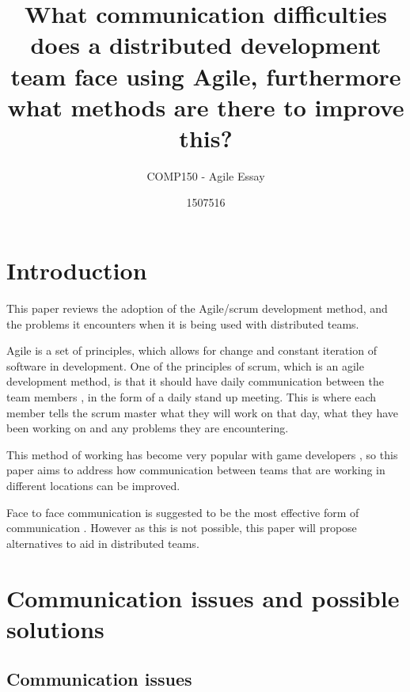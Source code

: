\documentclass{scrartcl}
\title{What communication difficulties does a distributed development team face using Agile, furthermore what methods are there to improve this?}
\subtitle{COMP150 - Agile Essay}
\author{1507516}
\begin{document}
\maketitle


\section{Introduction}

This paper reviews the adoption of the Agile/scrum development method, and the problems it encounters when it is being used with distributed teams.

Agile is a set of principles, which allows for change and constant iteration of software in development. One of the principles of scrum, which is an agile development method, is that it should have daily communication between the team members \cite{abdullah2011}, in the form of a daily stand up meeting. This is where each member tells the scrum master what they will work on that day, what they have been working on and any problems they are encountering. 

This method of working has become very popular with game developers \cite{campbell2016}, so this paper aims to address how communication between teams that are working in different locations can be improved. 

Face to face communication is suggested to be the most effective form of communication \cite{joshi2013}. However as this is not possible, this paper will propose alternatives to aid in distributed teams.









\section{Communication issues and possible solutions}
\subsection{Communication issues}
\end{document}
